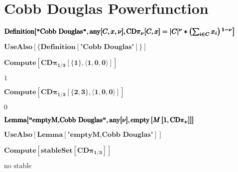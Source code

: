 \documentclass{article}
\begin{document}
\section*{Cobb Douglas Powerfunction}

\noindent\(\pmb{\text{Definition}[\text{$\texttt{"}$Cobb Douglas$\texttt{"}$},\text{any}[C,x,\nu ],}\\
\pmb{\left.\text{CD$\pi $}_{\nu }[C,x]=|C|^{\nu }* \left(\sum _{i\in C} x_i\right){}^{1-\nu }\right]}\)

\noindent\(\pmb{\text{UseAlso}[\{\text{Definition}[\text{$\texttt{"}$Cobb Douglas$\texttt{"}$}]\}]}\)

\noindent\(\pmb{\text{Compute}\left[\text{CD$\pi $}_{1/3}[\{1\},\langle 1,0,0\rangle ]\right]}\)

\noindent\(1\)

\noindent\(\pmb{\text{Compute}\left[\text{CD$\pi $}_{1/3}[\{2,3\},\langle 1,0,0\rangle ]\right]}\)

\noindent\(0\)

\noindent\(\pmb{\text{Lemma}[\text{$\texttt{"}$emptyM,Cobb Douglas$\texttt{"}$},\text{any}[\nu ],}\\
\pmb{\left.\text{empty}\left[M\left[1,\text{CD$\pi $}_{\nu }\right]\right]\right]}\)

\noindent\(\pmb{\text{UseAlso}[\text{Lemma}[\text{$\texttt{"}$emptyM,Cobb Douglas$\texttt{"}$}]]}\)

\noindent\(\pmb{\text{Compute}\left[\text{stableSet}\left[\text{CD$\pi $}_{1/3}\right]\right]}\)

\noindent\(\text{no stable}\)
\end{document}
